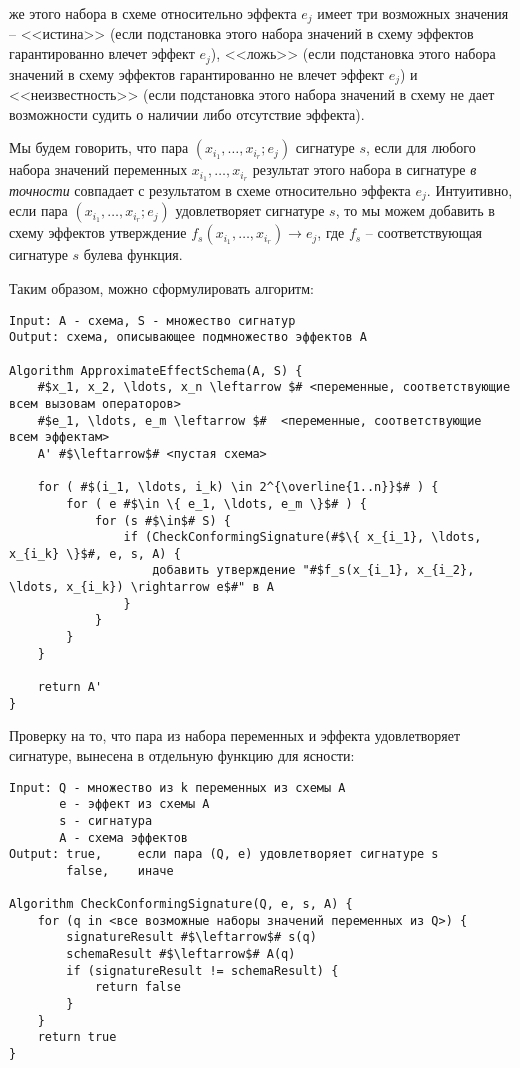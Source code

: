  же этого набора {в схеме относительно эффекта} $e_j$ имеет три возможных значения -- <<истина>> (если подстановка этого набора значений в схему эффектов гарантированно влечет эффект $e_j$), <<ложь>> (если подстановка этого набора значений в схему эффектов гарантированно не влечет эффект $e_j$) и <<неизвестность>> (если подстановка этого набора значений в схему не дает возможности судить о наличии либо отсутствие эффекта).

Мы будем говорить, что пара $(x_{i_1}, \ldots, x_{i_r}; e_j)$  сигнатуре $s$, если для любого набора значений переменных $x_{i_1}, \ldots, x_{i_r}$ результат этого набора в сигнатуре \emph{в точности} совпадает с результатом в схеме относительно эффекта $e_j$. Интуитивно, если пара $(x_{i_1}, \ldots, x_{i_r}; e_j)$ удовлетворяет сигнатуре $s$, то мы можем добавить в схему эффектов утверждение $f_s (x_{i_1}, \ldots, x_{i_r}) \rightarrow e_j$, где $f_s$ -- соответствующая сигнатуре $s$ булева функция.

Таким образом, можно сформулировать алгоритм:

\begin{verbatim}
Input: A - схема, S - множество сигнатур
Output: схема, описывающее подмножество эффектов A

Algorithm ApproximateEffectSchema(A, S) {
    #$x_1, x_2, \ldots, x_n \leftarrow $# <переменные, соответствующие всем вызовам операторов>
    #$e_1, \ldots, e_m \leftarrow $#  <переменные, соответствующие всем эффектам>
    A' #$\leftarrow$# <пустая схема>
	
    for ( #$(i_1, \ldots, i_k) \in 2^{\overline{1..n}}$# ) {
        for ( e #$\in \{ e_1, \ldots, e_m \}$# ) {
            for (s #$\in$# S) {
                if (CheckConformingSignature(#$\{ x_{i_1}, \ldots, x_{i_k} \}$#, e, s, A) {
                    добавить утверждение "#$f_s(x_{i_1}, x_{i_2}, \ldots, x_{i_k}) \rightarrow e$#" в A
                }
            }
        }
    }
	
    return A'
}
\end{verbatim}

Проверку на то, что пара из набора переменных и эффекта удовлетворяет сигнатуре, вынесена в отдельную функцию для ясности:

\begin{verbatim}
Input: Q - множество из k переменных из схемы A
       e - эффект из схемы A
       s - сигнатура
       A - схема эффектов
Output: true,     если пара (Q, e) удовлетворяет сигнатуре s
        false,    иначе

Algorithm CheckConformingSignature(Q, e, s, A) {
    for (q in <все возможные наборы значений переменных из Q>) {
        signatureResult #$\leftarrow$# s(q)
        schemaResult #$\leftarrow$# A(q)
        if (signatureResult != schemaResult) {
            return false
        }
    }
    return true
}
\end{verbatim}

